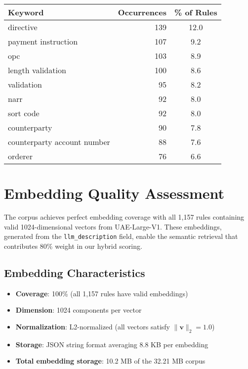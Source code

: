 \vspace{0.5em}
\noindent
\begin{minipage}{\textwidth}
\centering
\begin{tabular}{lrc}
\toprule
\textbf{Keyword} & \textbf{Occurrences} & \textbf{\% of Rules} \\
\midrule
directive & 139 & 12.0 \\
payment instruction & 107 & 9.2 \\
opc & 103 & 8.9 \\
length validation & 100 & 8.6 \\
validation & 95 & 8.2 \\
narr & 92 & 8.0 \\
sort code & 92 & 8.0 \\
counterparty & 90 & 7.8 \\
counterparty account number & 88 & 7.6 \\
orderer & 76 & 6.6 \\
\bottomrule
\end{tabular}
\label{tab:top-keywords}
\end{minipage}
\vspace{0.5em}

\section{Embedding Quality Assessment}

The corpus achieves perfect embedding coverage with all 1,157 rules containing valid 1024-dimensional vectors from UAE-Large-V1. These embeddings, generated from the \texttt{llm\_description} field, enable the semantic retrieval that contributes 80\% weight in our hybrid scoring.

\subsection{Embedding Characteristics}

\begin{itemize}[leftmargin=*,itemsep=2pt,topsep=2pt]
 \item \textbf{Coverage}: 100\% (all 1,157 rules have valid embeddings)
 \item \textbf{Dimension}: 1024 components per vector
 \item \textbf{Normalization}: L2-normalized (all vectors satisfy $\|\mathbf{v}\|_2 = 1.0$)
 \item \textbf{Storage}: JSON string format averaging 8.8 KB per embedding
 \item \textbf{Total embedding storage}: 10.2 MB of the 32.21 MB corpus
\end{itemize}


